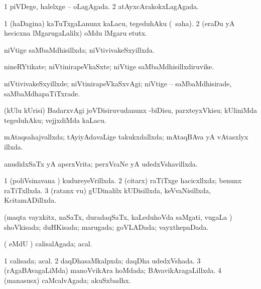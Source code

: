 {{\bentry
{} 
\gl{\gu}
\expl{}
\bmng
\bnum
\num{1} piVDege, halelxge -- oLagAgada. 
\num{2} atAyxcArakokxLagAgada. 
\enum
\emng
\eentry

\bentry
{} 
\gl{\sakirx}
\expl{}
\bmng
\bnum
\num{1} (haDagina) kaTuTxgaLanunx kaLacu, tegeduhAku (\rUpa\ saha). 
\num{2} (eraDu yA hecicxna lMgarugaLalilx) oMdu lMgaru etutx. 
\enum
\emng
\eentry

\bentry
{} 
\gl{\gu}
\expl{}
\bmng
niVtige saMbaMdhisillxda; niVtivivakeSxyillxda. 
\emng
\eentry

\bentry
{} 
\gl{\nA}
\expl{}
\bmng
nineRYtikate; niVtinirapeVkaSxte; niVtige saMbaMdhisillxdiruvike. 
\emng
\eentry

\bentry
{} 
\gl{\kirxvi}
\expl{}
\bmng
niVtivivakeSxyillxde; niVtinirapeVkaSxvAgi; niVtige -- saMbaMdhisirade, saMbaMdhapaTiTxrade. 
\emng
\eentry

\bentry
{} 
\gl{\sakirx}
\expl{}
\bmng
(kUlu kUrisi) BadarxvAgi joVDisiruvudanunx -biDisu, parxteyxVkisu; kUliniMda tegeduhAku; vejjxdiMda kaLacu. 
\emng
\eentry

\bentry
{} 
\gl{\gu}
\expl{}
\bmng
mAtaqsahajvallxda; tAyiyAdavaLige takukxdallxda; mAtaqBAva yA vAtasxlyx illxda. 
\emng
\eentry

\bentry
{} 
\gl{\gu}
\expl{}
\bmng
anudidxSaTx yA aperxVrita; perxVraNe yA udedxVshavillxda. 
\emng
\eentry

\bentry
{} 
\gl{\gu}
\expl{}
\bmng
\bnum
\num{1} (poliVsinavana \vi) kudureyeVrillxda. 
\num{2} (citarx) raTiTxge hacicxllxda; benunx raTiTxllxda. 
\num{3} (ratanx \mo vu) gUDinalilx kUDisillxda, keVvaNisillxda, KcitamADillxda. 
\enum
\emng
\eentry

\bentry
{} 
\gl{\gu}
\expl{}
\bmng
(maqta vayxkitx, naSaTx, duradaqSaTx, kaLeduhoVda saMgati, \mo vugaLa \vi) shoVkisada; duHKisada; marugada; goVLADada; vayxthepaDada. 
\emng
\eentry

\bentry
{} 
\gl{\gu}
\expl{}
\bmng
( eMdU \parx) calisalAgada; acal. 
\emng
\eentry

\bentry
{} 
\gl{\gu}
\expl{}
\bmng
\bnum
\num{1} calisada; acal. 
\num{2} daqDhasaMkalpxda; daqDha udedxVshada. 
\num{3} (rAgaBAvagaLiMda) manoVvikAra hoMdada; BAvavikAragaLillxda. 
\num{4} (manasusx) caMcalvAgada; akuSxbadhx. 
\enum
\emng
\eentry

}}
